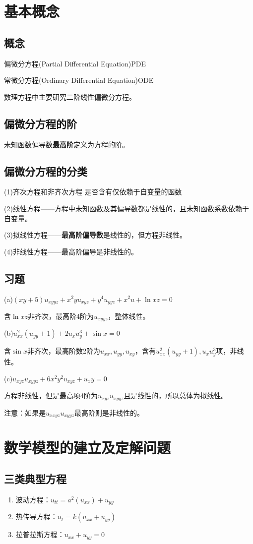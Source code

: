 \documentclass{article}
\begin{document}
\section{基本概念}
\subsection{概念}
偏微分方程(Partial Differential Equation)PDE

常微分方程(Ordinary Differential Equation)ODE

数理方程中主要研究二阶线性偏微分方程。
\subsection{偏微分方程的阶}
未知函数偏导数\textbf{最高阶}定义为方程的阶。

\subsection{偏微分方程的分类}
(1)齐次方程和非齐次方程
是否含有仅依赖于自变量的函数

(2)线性方程——方程中未知函数及其偏导数都是线性的，且未知函数系数依赖于自变量。

(3)拟线性方程——\textbf{最高阶偏导数}是线性的，但方程非线性。

(4)非线性方程——最高阶偏导是非线性的。

\subsection{习题}
(a)$(xy +5)u_{xyyz} + x^2yu_{xyz} + y^4u_{yyz} + x^2u + \ln xz = 0$

含$\ln xz$非齐次，最高阶4阶为$u_{xyyz}$，整体线性。

(b)$u_{xx}^2(u_{yy}+1)+2u_xu_y^3+\sin x = 0$

含$\sin x$非齐次，最高阶数2阶为$u_{xx},u_{yy},u_{xy}$，含有$u_{xx}^2(u_{yy}+1),u_xu_y^3$项，非线性。

(c)$u_{xyz}u_{xyyz}+6x^2y^2u_{xyz}+u_xy=0$

方程非线性，但是最高项4阶为$u_{xyz}u_{xyyz}$且是线性的，所以总体为拟线性。

注意：如果是$u_{xxyz}u_{xyyz}$最高阶则是非线性的。

\section{数学模型的建立及定解问题}
\subsection{三类典型方程}
\begin{enumerate}
    \item 波动方程：$u_{tt}=a^2(u_{xx})+u_{yy}$
    \item 热传导方程：$u_t=k(u_{xx}+u_{yy})$
    \item 拉普拉斯方程：$u_{xx}+u_{yy}=0$
\end{enumerate}
\end{document}
